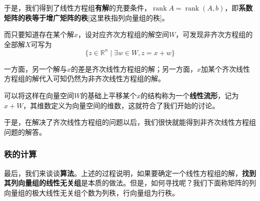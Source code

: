 \documentclass[a4paper,UTF8,fontset=windows]{ctexart}
\DeclareMathOperator{\rank}{rank}
\newcommand*{\note}{\noindent *}
\begin{document}
于是，我们得到了线性方程组\textbf{有解}的充要条件，$\rank A=\rank (A,b)$，即\textbf{系数矩阵的秩等于增广矩阵的秩}[这里秩指列向量组的秩]。

而只要知道存在某个解$x$，设对应齐次方程组的解空间$W$，可发现非齐次方程组的全部解$X$可写为
$$\{z\in\mathbb{R}^n\mid\exists w\in W,z=x+w\}$$

\note 一方面，另一个解与$x$的差是齐次线性方程组的解；另一方面，$x$加某个齐次线性方程组的解代入可知仍然为非齐次线性方程组的解。

\note 可以将这样在向量空间$W$的基础上平移某个$x$的结构称为一个\textbf{线性流形}，记为$x+W$，其维数定义为向量空间的维数，这就符合了我们开始的讨论。

于是，在解决了齐次线性方程组的问题以后，我们很快就能得到非齐次线性方程组问题的解答。

\subsubsection{秩的计算}
最后，我们来谈谈\textbf{算法}。上述的过程说明，如果要确定一个线性方程组的解，\textbf{找到其列向量组的线性无关组}是本质的做法。但是，如何寻找呢？我们下面称矩阵的列向量组的极大线性无关组个数为列秩，行向量组为行秩。
\end{document}

